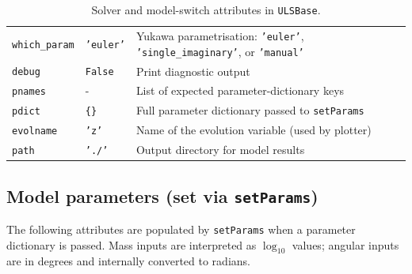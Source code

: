 \documentclass[12pt, a4paper]{article}
\begin{document}
\begin{table}[H]
\begin{tabular}{p{4.2cm} p{3.8cm} p{6.0cm}}
\texttt{which\_param}   & \texttt{'euler'}                      & Yukawa parametrisation: \texttt{'euler'}, \texttt{'single\_imaginary'}, or \texttt{'manual'} \\
\texttt{debug}          & \texttt{False}                        & Print diagnostic output \\
\texttt{pnames}         & - & List of expected parameter-dictionary keys \\
\texttt{pdict}          & \texttt{\{\}}                         & Full parameter dictionary passed to \texttt{setParams} \\
\texttt{evolname}       & \texttt{'z'}                          & Name of the evolution variable (used by plotter) \\
\texttt{path}           & \texttt{'./'}                          & Output directory for model results \\
\hline
\end{tabular}
\caption{Solver and model-switch attributes in \texttt{ULSBase}.}
\label{tab:ulsbase_solver}
\end{table}

\subsection*{Model parameters (set via \texttt{setParams})}

The following attributes are populated by \texttt{setParams} when a parameter dictionary is
passed. Mass inputs are interpreted as $\log_{10}$ values; angular inputs are in degrees and
internally converted to radians.
\end{document}
